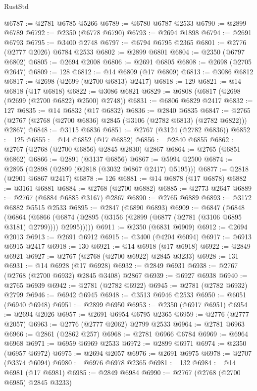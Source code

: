 \begin{lexlean}{RustStd}
\begin{coremodule}
@6787 := @2781 @6785 @5266
@6789 := @6780 @6787 @2533
@6790 := @2899 @6789
@6792 := @2350 (@6778 @6790)
@6793 := @2694 @1898
@6794 := @2691 @6793
@6795 := @3400 @2748
@6797 := @6794 @6795 @2365
@6801 := @2776 (@2777 @2026) @6784 @2533
@6802 := @2899 @6801
@6804 := @2350 (@6797 @6802)
@6805 := @2694 @2008
@6806 := @2691 @6805
@6808 := @2698 (@2705 @2647)
@6809 := 128
@6812 := @14 @6809 (@17 @6809)
@6813 := @3086 @6812
@6817 := @2698 (@2699 (@2700 @6813) @2417)
@6818 := 129
@6821 := @14 @6818 (@17 @6818)
@6822 := @3086 @6821
@6829 := @6808 (@6817 (@2698 (@2699 (@2700 @6822) @2500) @2748))
@6831 := @6806 @6829 @2417
@6832 := 127
@6835 := @14 @6832 (@17 @6832)
@6836 := @2840 @6835
@6847 := @2765 (@2767 (@2768 (@2700 @6836) @2845 (@3106 (@2782 @6813) (@2782 @6822))) @2867)
@6848 := @3115 @6836
@6851 := @2767 (@3124 (@2782 @6836))
@6852 := 125
@6855 := @14 @6852 (@17 @6852)
@6856 := @2840 @6855
@6862 := @2767 (@2768 (@2700 @6856) @2845 @2830) @2867
@6864 := @2765 (@6851 @6862)
@6866 := @2891 (@3137 @6856)
@6867 := @5994 @2500
@6874 := @2895 (@2898 (@2899 (@2818 (@3032 @6867 @2417) @5195)))
@6877 := @2818 (@2901 @6867 @2417)
@6878 := 126
@6881 := @14 @6878 (@17 @6878)
@6882 := @3161 @6881
@6884 := @2768 (@2700 @6882)
@6885 := @2773 @2647
@6889 := @2767 (@6884 @6885 @3167) @2867
@6890 := @2765 @6889
@6893 := @3172 @6882 @5515 @2533
@6895 := @2847 (@6890 @6893)
@6909 := @6847
    (@6848
      (@6864
        (@6866 (@6874 (@2895 (@3156 (@2899 (@6877 (@2781 (@3106 @6895 @3181) @2799)))) @2995)))))
@6911 := @2350 (@6831 @6909)
@6912 := @2694 @2013
@6913 := @2691 @6912
@6915 := @3400 (@4204 @6094)
@6917 := @6913 @6915 @2417
@6918 := 130
@6921 := @14 @6918 (@17 @6918)
@6922 := @2849 @6921
@6927 := @2767 (@2768 (@2700 @6922) @2845 @3233)
@6928 := 131
@6931 := @14 @6928 (@17 @6928)
@6932 := @2849 @6931
@6938 := @2767 (@2768 (@2700 @6932) @2845 @3408) @2867
@6939 := @6927 @6938
@6940 := @2765 @6939
@6942 := @2781 (@2782 @6922)
@6945 := @2781 (@2782 @6932) @2799
@6946 := @6942 @6945
@6948 := @3513 @6946 @2533
@6950 := @6051 (@6940 @6948)
@6951 := @2899 @6950
@6953 := @2350 (@6917 @6951)
@6954 := @2694 @2026
@6957 := @2691 @6954 @6795 @2365
@6959 := @2776 (@2777 @2057)
@6963 := @2776 (@2777 @2062) @2799 @2533
@6964 := @2781 @6963
@6966 := @2861 (@2862 @257)
@6968 := @2781 @6966 @6784
@6969 := @6964 @6968
@6971 := @6959 @6969 @2533
@6972 := @2899 @6971
@6974 := @2350 (@6957 @6972)
@6975 := @2694 @2057
@6976 := @2691 @6975
@6978 := @2707 (@3374 @6094)
@6980 := @6976 @6978 @2365
@6981 := 132
@6984 := @14 @6981 (@17 @6981)
@6985 := @2849 @6984
@6990 := @2767 (@2768 (@2700 @6985) @2845 @3233)

\end{coremodule}
\end{lexlean}
